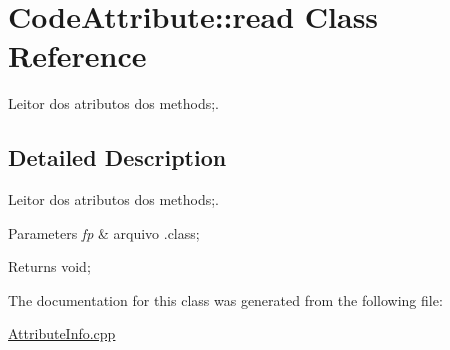 \hypertarget{class_code_attribute_1_1read}{}\section{Code\+Attribute\+:\+:read Class Reference}
\label{class_code_attribute_1_1read}


Leitor dos atributos dos methods;.  




\subsection{Detailed Description}
Leitor dos atributos dos methods;. 


\begin{DoxyParams}{Parameters}
{\em fp} & arquivo .class; \\
\hline
\end{DoxyParams}
\begin{DoxyReturn}{Returns}
void; 
\end{DoxyReturn}


The documentation for this class was generated from the following file\+:\begin{DoxyCompactItemize}
\item 
\hyperlink{_attribute_info_8cpp}{Attribute\+Info.\+cpp}\end{DoxyCompactItemize}
